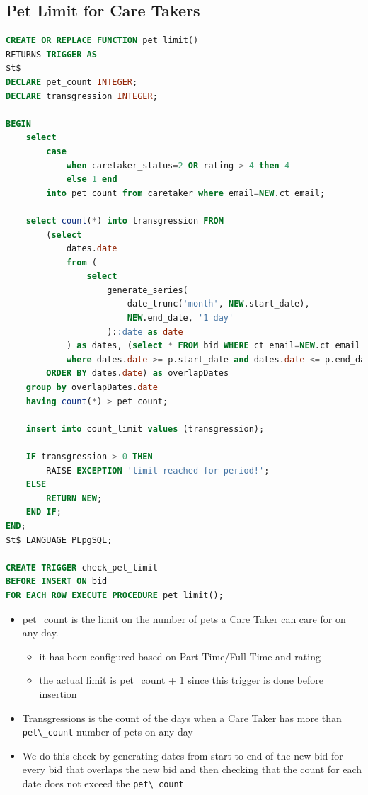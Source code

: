\documentclass[
  paper=a4,
  ,captions=tableheading
]{scrartcl}
\newcommand{\passthrough}[1]{#1}
\providecommand{\tightlist}{%
  \setlength{\itemsep}{0pt}\setlength{\parskip}{0pt}}
\begin{document}
\hypertarget{pet-limit-for-care-takers}{%
\subsection{Pet Limit for Care Takers}\label{pet-limit-for-care-takers}}

\begin{lstlisting}[language=SQL]
CREATE OR REPLACE FUNCTION pet_limit()
RETURNS TRIGGER AS
$t$
DECLARE pet_count INTEGER;
DECLARE transgression INTEGER;

BEGIN
    select
        case
            when caretaker_status=2 OR rating > 4 then 4
            else 1 end
        into pet_count from caretaker where email=NEW.ct_email;

    select count(*) into transgression FROM
        (select
            dates.date
            from (
                select
                    generate_series(
                        date_trunc('month', NEW.start_date),
                        NEW.end_date, '1 day'
                    )::date as date
            ) as dates, (select * FROM bid WHERE ct_email=NEW.ct_email) as p
            where dates.date >= p.start_date and dates.date <= p.end_date
        ORDER BY dates.date) as overlapDates
    group by overlapDates.date
    having count(*) > pet_count;

    insert into count_limit values (transgression);

    IF transgression > 0 THEN
        RAISE EXCEPTION 'limit reached for period!';
    ELSE
        RETURN NEW;
    END IF;
END;
$t$ LANGUAGE PLpgSQL;

CREATE TRIGGER check_pet_limit
BEFORE INSERT ON bid
FOR EACH ROW EXECUTE PROCEDURE pet_limit();
\end{lstlisting}

\begin{itemize}
\tightlist
\item
  pet\_count is the limit on the number of pets a Care Taker can care
  for on any day.

  \begin{itemize}
  \tightlist
  \item
    it has been configured based on Part Time/Full Time and rating
  \item
    the actual limit is pet\_count + 1 since this trigger is done before
    insertion
  \end{itemize}
\item
  Transgressions is the count of the days when a Care Taker has more
  than \passthrough{\lstinline!pet\_count!} number of pets on any day
\item
  We do this check by generating dates from start to end of the new bid
  for every bid that overlaps the new bid and then checking that the
  count for each date does not exceed the
  \passthrough{\lstinline!pet\_count!}
\end{itemize}
\end{document}
